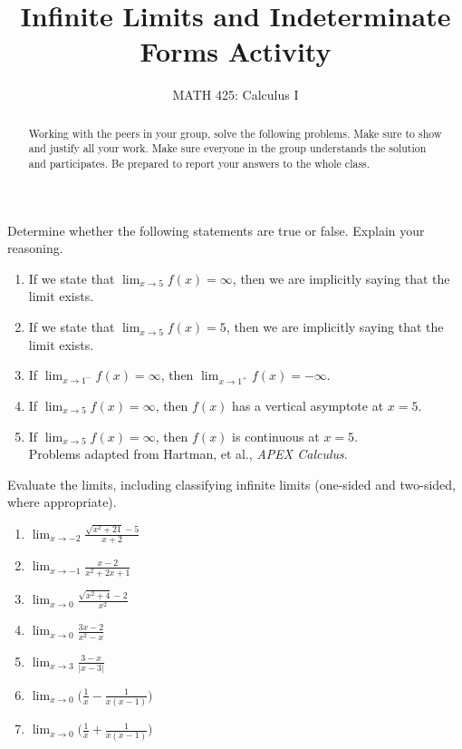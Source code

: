 \documentclass{ximera}
\title{Infinite Limits and Indeterminate Forms Activity}
\author{MATH 425: Calculus I}
\begin{document}
\begin{abstract}
    Working with the peers in your group, solve the following problems. Make sure to show and justify all your work. Make sure everyone in the group understands the solution and participates. Be prepared to report your answers to the whole class. 
\end{abstract}
\maketitle

\begin{exercise}
    Determine whether the following statements are true or false.  Explain your reasoning.
    \begin{enumerate}
        \item If we state that $\lim_{x\rightarrow 5}f(x)=\infty$, then we are implicitly saying that the limit exists.
        \item If we state that $\lim_{x\rightarrow 5}f(x)=5$, then we are implicitly saying that the limit exists.
        \item If $\lim_{x\rightarrow 1^-}f(x)=\infty$, then $\lim_{x\rightarrow 1^+}f(x)=-\infty$.
        \item If $\lim_{x\rightarrow 5}f(x)=\infty$, then $f(x)$ has a vertical asymptote at $x=5$.
        \item If $\lim_{x\rightarrow 5}f(x)=\infty$, then $f(x)$ is continuous at $x=5$.\\
         Problems adapted from Hartman, et al., \textit{APEX Calculus}.
    \end{enumerate} 
\end{exercise}

\begin{exercise}
    Evaluate the limits, including classifying infinite limits (one-sided and two-sided, where appropriate).
\begin{enumerate}
    \item $\displaystyle \lim_{x\rightarrow -2}\frac{\sqrt{x^2+21}-5}{x+2}$ 
    
    \item $\displaystyle \lim_{x\rightarrow -1}\frac{x-2}{x^2+2x+1}$ \\
    
    
    \item $\displaystyle\lim_{x\rightarrow 0}\frac{\sqrt{x^2+4}-2}{x^2}$ 
    

    \item $\displaystyle \lim_{x\rightarrow 0}\frac{3x-2}{x^2-x}$

    \item $\displaystyle \lim_{x\rightarrow 3} \frac{3-x}{|x-3|}$

    \item $\displaystyle \lim_{x\rightarrow 0} \bigg( \frac{1}{x}-\frac{1}{x(x-1)}\bigg)$

     \item $\displaystyle \lim_{x\rightarrow 0} \bigg( \frac{1}{x}+\frac{1}{x(x-1)}\bigg)$

  \end{enumerate}
\end{exercise} 
\end{document}
